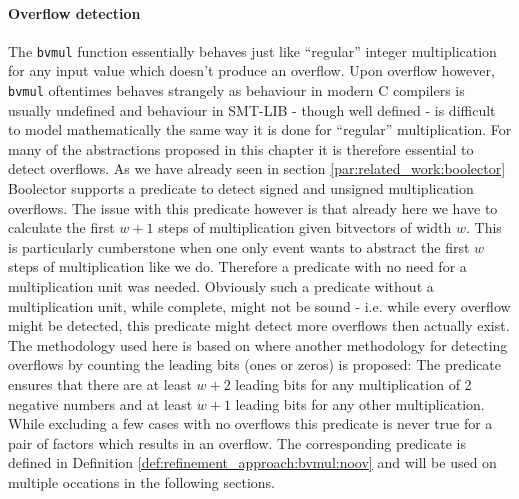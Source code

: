 \paragraph{Overflow detection}
The \texttt{bvmul} function essentially behaves just like \enquote{regular} integer multiplication for any input value
which doesn't produce an overflow.
Upon overflow however, \texttt{bvmul} oftentimes behaves strangely as behaviour in modern C compilers is usually undefined
and behaviour in SMT-LIB - though well defined - is difficult to model mathematically the same way it is done for \enquote{regular} multiplication.
For many of the abstractions proposed in this chapter it is therefore essential to detect overflows.
As we have already seen in section \ref{par:related_work:boolector} Boolector supports a predicate to detect signed and unsigned multiplication overflows.
The issue with this predicate however is that already here we have to calculate the first $w+1$ steps of multiplication given bitvectors of width $w$.
This is particularly cumberstone when one only event wants to abstract the first $w$ steps of multiplication like we do.
Therefore a predicate with no need for a multiplication unit was needed.
Obviously such a predicate without a multiplication unit, while complete, might not be sound - i.e. while every overflow might be detected,
this predicate might detect more overflows then actually exist.
The methodology used here is based on \cite{Warren-HackersDelight} where another methodology for detecting overflows by counting the leading bits (ones or zeros)
is proposed:
The predicate ensures that there are at least $w+2$ leading bits for any multiplication of 2 negative numbers and at least $w+1$ leading bits for any other multiplication.
While excluding a few cases with no overflows this predicate is never true for a pair of factors which results in an overflow.
The corresponding predicate is defined in Definition \ref{def:refinement_approach:bvmul:noov} and will be used on multiple occations in the following sections.
